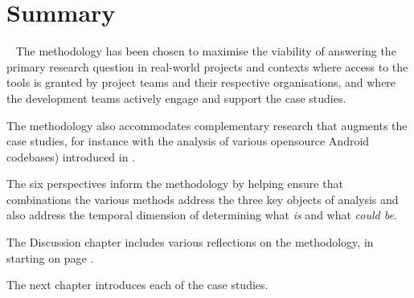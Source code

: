 \section[Summary of the methodology chapter]{Summary}~\label{methodology-summary-section}
The methodology has been chosen to maximise the viability of answering the primary research question in real-world projects and contexts where access to the tools is granted by project teams and their respective organisations, and where the development teams actively engage and support the case studies.

The methodology also accommodates complementary research that augments the case studies, for instance with the analysis of various opensource Android codebases) introduced in .

The six perspectives inform the methodology by helping ensure that combinations the various methods address the three key objects of analysis and also address the temporal dimension of determining what \textit{is} and what \textit{could be}.

The Discussion chapter includes various reflections on the methodology, in  starting on page \pageref{discussion-on-methodology-and-case-study-procedure}.

The next chapter introduces each of the case studies.